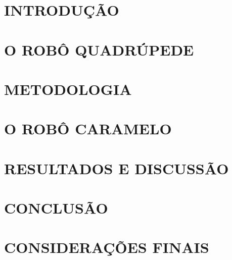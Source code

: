 \documentclass[a4paper, 12pt, twocolumn]{article}
\begin{document}
    

    \section{\MakeUppercase{Introdução}}
    \label{sec:intro}
    

    \section{\MakeUppercase{O robô quadrúpede}}
    \label{sec:the_quadruped_robot}
    

    \section{\MakeUppercase{Metodologia}}
    \label{sec:methodology}
    

    \section{\MakeUppercase{O robô Caramelo}}
    \label{sec:the_caramel}
    

    \section{\MakeUppercase{Resultados e Discussão}}
    \label{sec:results}
    

    \section{\MakeUppercase{Conclusão}}
    \label{sec:conclusion}
    

    \section{\MakeUppercase{Considerações finais}}
    \label{sec:final_points}
    

    
    
\end{document}

